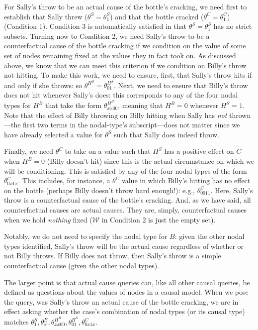 \documentclass[
  12pt,
]{book}
\begin{document}
For Sally's throw to be an actual cause of the bottle's cracking, we need first to establish that Sally threw (\(\theta^S=\theta^S_1\)) and that the bottle cracked (\(\theta^C=\theta^C_1\)) (Condition 1). Condition 3 is automatically satisfied in that \(\theta^S=\theta^S_1\) has no strict subsets. Turning now to Condition 2, we need Sally's throw to be a counterfactual cause of the bottle cracking if we condition on the value of some set of nodes remaining fixed at the values they in fact took on. As discussed above, we know that we can meet this criterion if we condition on Billy's throw not hitting. To make this work, we need to ensure, first, that Sally's throw hits if and only if she throws: so \(\theta^{H^S}=\theta^{H^S}_{01}\). Next, we need to ensure that Billy's throw does not hit whenever Sally's does: this corresponds to any of the four nodal types for \(H^B\) that take the form \(\theta^{H^B}_{xx00}\), meaning that \(H^B=0\) whenever \(H^S=1\). Note that the effect of Billy throwing on Billy hitting when Sally has \emph{not} thrown---the first two terms in the nodal-type's subscript---does not matter since we have already selected a value for \(\theta^S\) such that Sally does indeed throw.

Finally, we need \(\theta^C\) to take on a value such that \(H^S\) has a positive effect on \(C\) when \(H^B=0\) (Billy doesn't hit) since this is the actual circumstance on which we will be conditioning. This is satisfied by any of the four nodal types of the form \(\theta^C_{0x1x}\). This includes, for instance, a \(\theta^C\) value in which Billy's hitting has no effect on the bottle (perhaps Billy doesn't throw hard enough!): e.g., \(\theta^C_{0011}\). Here, Sally's throw is a counterfactual cause of the bottle's cracking. And, as we have said, all counterfactual causes are actual causes. They are, simply, counterfactual causes when we hold \emph{nothing} fixed (\(\mathcal W\) in Condition 2 is just the empty set).

Notably, we do not need to specify the nodal type for \(B\): given the other nodal types identified, Sally's throw will be the actual cause regardless of whether or not Billy throws. If Billy does not throw, then Sally's throw is a simple counterfactual cause (given the other nodal types).

The larger point is that actual cause queries can, like all other causal queries, be defined as questions about the values of nodes in a causal model. When we pose the query, was Sally's throw an actual cause of the bottle cracking, we are in effect asking whether the case's combination of nodal types (or its causal type) matches \(\theta^S_1, \theta^B_x, \theta^{H^B}_{xx00}, \theta^{H^S}_{01}, \theta^C_{0x1x}\).
\end{document}
